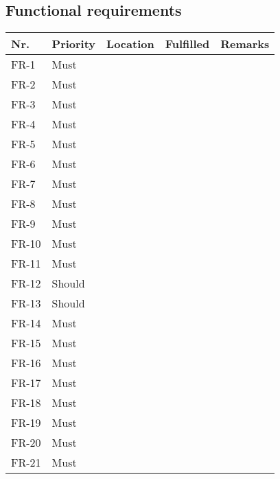 \subsection{Functional requirements}
\begin{table}
    \begin{tabular}{lllll}
    
        Nr.   & Priority & Location & Fulfilled & Remarks \\ \hline
        FR-1  & Must     & ~        & ~         & ~       \\ 
        FR-2  & Must     & ~        & ~         & ~       \\ 
        FR-3  & Must     & ~        & ~         & ~       \\ 
        FR-4  & Must     & ~        & ~         & ~       \\ 
        FR-5  & Must     & ~        & ~         & ~       \\ 
        FR-6  & Must     & ~        & ~         & ~       \\ 
        FR-7  & Must     & ~        & ~         & ~       \\ 
        FR-8  & Must     & ~        & ~         & ~       \\ 
        FR-9  & Must     & ~        & ~         & ~       \\ 
        FR-10 & Must     & ~        & ~         & ~       \\ 
        FR-11 & Must     & ~        & ~         & ~       \\ 
        FR-12 & Should   & ~        & ~         & ~       \\ 
        FR-13 & Should   & ~        & ~         & ~       \\ 
        FR-14 & Must     & ~        & ~         & ~       \\ 
        FR-15 & Must     & ~        & ~         & ~       \\ 
        FR-16 & Must     & ~        & ~         & ~       \\ 
        FR-17 & Must     & ~        & ~         & ~       \\ 
        FR-18 & Must     & ~        & ~         & ~       \\ 
        FR-19 & Must     & ~        & ~         & ~       \\ 
        FR-20 & Must     & ~        & ~         & ~       \\ 
        FR-21 & Must     & ~        & ~         & ~       \\ 

\end{tabular}
\end{table}
